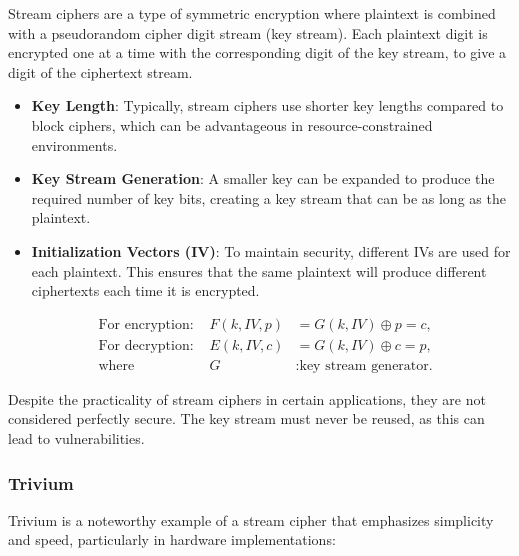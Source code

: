 \documentclass[12pt]{article}
\begin{document}
Stream ciphers are a type of symmetric encryption where plaintext is combined with a pseudorandom cipher digit stream (key stream). Each plaintext digit is encrypted one at a time with the corresponding digit of the key stream, to give a digit of the ciphertext stream.

\begin{itemize}
    \item \textbf{Key Length}: Typically, stream ciphers use shorter key lengths compared to block ciphers, which can be advantageous in resource-constrained environments.
    \item \textbf{Key Stream Generation}: A smaller key can be expanded to produce the required number of key bits, creating a key stream that can be as long as the plaintext.
    \item \textbf{Initialization Vectors (IV)}: To maintain security, different IVs are used for each plaintext. This ensures that the same plaintext will produce different ciphertexts each time it is encrypted.
\end{itemize}

\begin{align*}
    &\text{For encryption: } &F(k, IV, p) &= G(k, IV) \oplus p = c, \\
    &\text{For decryption: } &E(k, IV, c) &= G(k, IV) \oplus c = p, \\
    &\text{where } &G &: \text{key stream generator.}
\end{align*}

Despite the practicality of stream ciphers in certain applications, they are not considered perfectly secure. The key stream must never be reused, as this can lead to vulnerabilities.

\subsubsection*{Trivium}

Trivium is a noteworthy example of a stream cipher that emphasizes simplicity and speed, particularly in hardware implementations:
\end{document}
